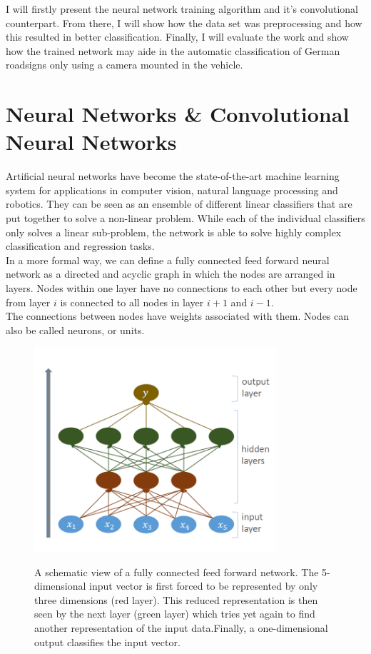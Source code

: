 \documentclass[11pt,a4paper]{article}
\begin{document}
I will firstly present the neural network training algorithm and it's convolutional counterpart. From there, I will show how the data set was preprocessing and how this resulted in better classification. Finally, I will evaluate the work and show how the trained network may aide in the automatic classification of German roadsigns only using a camera mounted in the vehicle.

\section{Neural Networks \& Convolutional Neural Networks}
Artificial neural networks have become the state-of-the-art machine learning system for applications in computer vision, natural language processing and robotics.\cite{visionANN, nlpANN, roboticsANN} They can be seen as an ensemble of different linear classifiers that are put together to solve a non-linear problem. While each of the individual classifiers only solves a linear sub-problem, the network is able to solve highly complex classification and regression tasks.\\
In a more formal way, we can define a fully connected feed forward neural network as a directed and acyclic graph in which the nodes are arranged in layers. Nodes within one layer have no connections to each other but every node from layer $i$ is connected to all nodes in layer $i+1$ and $i-1$.\\
The connections between nodes have weights associated with them. Nodes can also be called neurons, or units.
\begin{figure}[h!]
	\includegraphics[width=0.8\textwidth]{ann_forward.png}
	\centering
	\label{fig:ann}
	\caption[Artificial Neural Network]{A schematic view of a fully connected feed forward network. The 5-dimensional input vector is first forced to be represented by only three dimensions (red layer). This reduced representation is then seen by the next layer (green layer) which tries yet again to find another representation of the input data.Finally, a one-dimensional output classifies the input vector.}
\end{figure}
\end{document}

